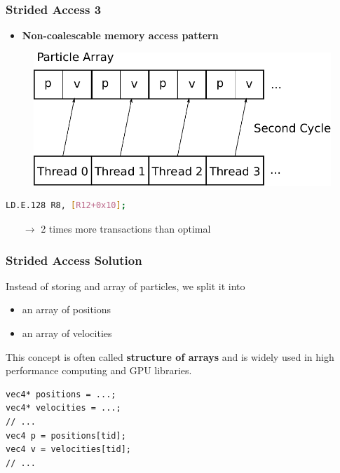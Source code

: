 \documentclass[aspectratio=169,handout]{beamer}
\begin{document}
\begin{frame}[fragile]
	\frametitle{Strided Access 3}
	\begin{itemize}
		\item 	\textbf{Non-coalescable memory access pattern}
	\end{itemize}

	\begin{figure}
		\centering
		\includegraphics[height=0.5\textheight]{accessParticle2}
	\end{figure}
\begin{lstlisting}[language=bash]               
LD.E.128 R8, [R12+0x10];  
\end{lstlisting} 
\begin{itemize}
	\item[$\rightarrow$] 2 times more transactions than optimal
	\end{itemize}
\end{frame}

\begin{frame}[fragile]
\frametitle{Strided Access Solution}
Instead of storing and array of particles, we split it into
\begin{itemize}
	\item an array of positions
	\item an array of velocities
\end{itemize}
This concept is often called \textbf{structure of arrays} and is widely used in high performance computing and GPU libraries.
\begin{lstlisting}
vec4* positions = ...;
vec4* velocities = ...;
// ...
vec4 p = positions[tid];
vec4 v = velocities[tid];
// ...
\end{lstlisting}
\end{frame}
\end{document}
